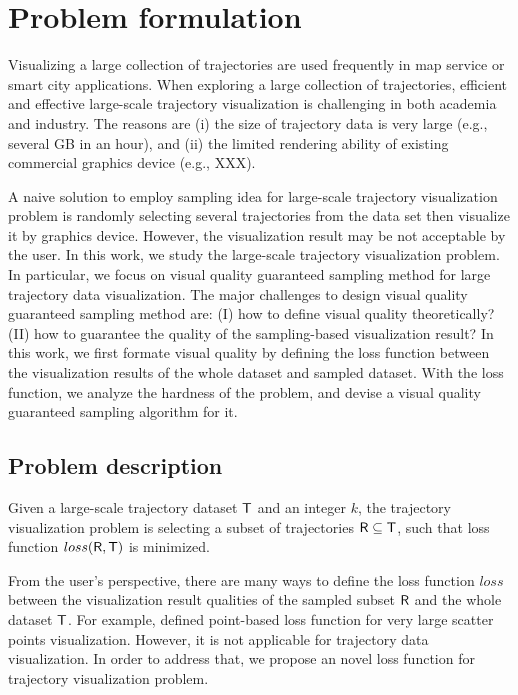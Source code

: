 \section{Problem formulation}\label{sec:pro}

Visualizing a large collection of trajectories are used frequently in map service or smart city applications.
When exploring a large collection of trajectories, efficient and effective large-scale trajectory visualization is challenging in both academia and industry.
The reasons are (i) the size of trajectory data is very large (e.g., several GB in an hour),
and (ii) the limited rendering ability of existing commercial graphics device (e.g., XXX).

A naive solution to employ sampling idea for large-scale trajectory visualization problem is randomly selecting several trajectories from the data set then visualize it by graphics device.
However, the visualization result may be not acceptable by the user.
In this work, we study the large-scale trajectory visualization problem.
In particular, we focus on visual quality guaranteed sampling method for large trajectory data visualization.
The major challenges to design visual quality guaranteed sampling method are:
(I) how to define visual quality theoretically? (II) how to guarantee the quality of the sampling-based visualization result?
In this work, we first formate visual quality by defining the loss function between the visualization results of the whole dataset and sampled dataset.
With the loss function, we analyze the hardness of the problem, and devise a visual quality guaranteed sampling algorithm for it.


\subsection{Problem description}
\begin{problem}\label{prob:def}
Given a large-scale trajectory dataset $\mathsf{T}$ and an integer $k$,
the trajectory visualization problem is selecting a subset of trajectories $\mathsf{R} \subseteq \mathsf{T}$, such that loss function $loss(\mathsf{R},\mathsf{T})$ is minimized.
\end{problem}

From the user’s perspective, there are many ways to define the loss function $loss$ between the visualization result qualities of the sampled subset $\mathsf{R}$ and the whole dataset $\mathsf{T}$.
For example, \cite{park2016visualization} defined point-based loss function for very large scatter points visualization.
However, it is not applicable for trajectory data visualization.
In order to address that, we propose an novel loss function for trajectory visualization problem.

